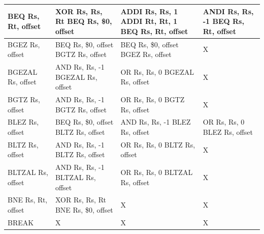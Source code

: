 \documentclass[a4paper,twoside]{article}
\theoremstyle{definition}
\theoremstyle{remark}
\begin{document}
\begin{table}[H]
\begin{tabular}{|p{}|p{}|p{}|p{}|}
BEQ Rs, Rt, offset& XOR Rs, Rs, Rt\newline
                    BEQ Rs, \$0, offset &
                    ADDI Rs, Rs, 1 \newline
                    ADDI Rt, Rt, 1 \newline
                    BEQ Rs, Rt, offset&
                    ANDI Rs, Rs, -1 \newline
                    BEQ Rs, Rt, offset
                      \\  \hline
BGEZ Rs, offset& BEQ Rs, \$0, offset\newline
                 BGTZ Rs, offset &
                 BEQ Rs, \$0, offset\newline
                 BGEZ Rs, offset & X  \\  \hline
BGEZAL Rs, offset& AND Rs, Rs, -1 \newline
                   BGEZAL Rs, offset &
                   OR Rs, Rs, 0 \newline
                   BGEZAL Rs, offset& X \\  \hline
BGTZ Rs, offset&  AND Rs, Rs, -1 \newline
                   BGTZ Rs, offset &
                   OR Rs, Rs, 0 \newline
                   BGTZ Rs, offset& X \\  \hline
BLEZ Rs, offset& BEQ Rs, \$0, offset\newline
                 BLTZ Rs, offset& 
                 AND Rs, Rs, -1\newline
                 BLEZ Rs, offset& 
                 OR Rs, Rs, 0\newline
                 BLEZ Rs, offset \\  \hline
BLTZ Rs, offset&   AND Rs, Rs, -1 \newline
                   BLTZ Rs, offset &
                   OR Rs, Rs, 0 \newline
                   BLTZ Rs, offset& X \\  \hline
BLTZAL Rs, offset & AND Rs, Rs, -1 \newline
                   BLTZAL Rs, offset &
                   OR Rs, Rs, 0 \newline
                   BLTZAL Rs, offset& X \\  \hline
BNE Rs, Rt, offset& XOR Rs, Rs, Rt \newline
                    BNE Rs, \$0, offset& X & X  \\  \hline
BREAK&X &	X & X \\  \hline

\end{tabular}
\end{table}
\end{document}
